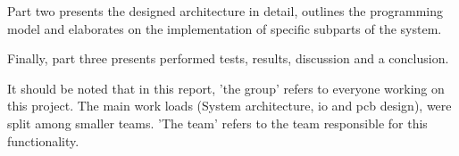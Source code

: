 Part two presents the designed architecture in detail, outlines the programming model and elaborates on the implementation of specific subparts of the system.

Finally, part three presents performed tests, results, discussion and a conclusion.

It should be noted that in this report, 'the group' refers to everyone working on this project. The main work loads (System architecture, \gls{io} and \gls{pcb} design), were split among smaller teams. 'The team' refers to the team responsible for this functionality.
